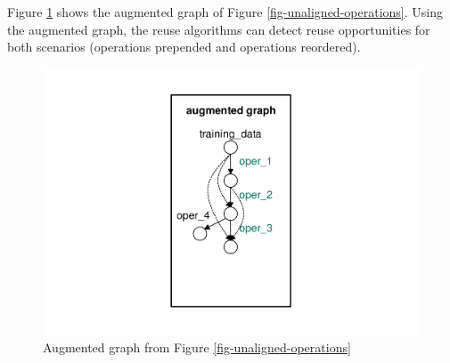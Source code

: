 Figure \ref{fig-augmented-graph} shows the augmented graph of Figure \ref{fig-unaligned-operations}.
Using the augmented graph, the reuse algorithms can detect reuse opportunities for both scenarios (operations prepended and operations reordered).

\begin{figure}
\centering
\includegraphics[width=0.33\columnwidth]{../images/augmented-graph}
\caption{Augmented graph from Figure \ref{fig-unaligned-operations} }
\label{fig-augmented-graph}
\end{figure}

%
